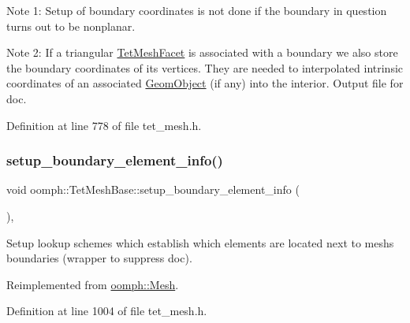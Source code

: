 Note 1\+: Setup of boundary coordinates is not done if the boundary in question turns out to be nonplanar.

Note 2\+: If a triangular \hyperlink{classoomph_1_1TetMeshFacet}{Tet\+Mesh\+Facet} is associated with a boundary we also store the boundary coordinates of its vertices. They are needed to interpolated intrinsic coordinates of an associated \hyperlink{classoomph_1_1GeomObject}{Geom\+Object} (if any) into the interior. Output file for doc. 

Definition at line 778 of file tet\+\_\+mesh.\+h.

\mbox{\label{classoomph_1_1TetMeshBase_ac372c93f2834c864f7376f1aceda718f}} 
\subsubsection{\texorpdfstring{setup\+\_\+boundary\+\_\+element\+\_\+info()}{setup\_boundary\_element\_info()}\hspace{0.1cm}{\footnotesize\ttfamily [1/2]}}
{\footnotesize\ttfamily void oomph\+::\+Tet\+Mesh\+Base\+::setup\+\_\+boundary\+\_\+element\+\_\+info (\begin{DoxyParamCaption}{ }\end{DoxyParamCaption})\hspace{0.3cm}{\ttfamily [inline]}, {\ttfamily [virtual]}}

Setup lookup schemes which establish which elements are located next to mesh\textquotesingle{}s boundaries (wrapper to suppress doc). 

Reimplemented from \hyperlink{classoomph_1_1Mesh_a6cc8bcd6b41209f0e9295cc993d9c6bb}{oomph\+::\+Mesh}.



Definition at line 1004 of file tet\+\_\+mesh.\+h.

\mbox{\label{classoomph_1_1TetMeshBase_a5982b96584e7f60eeb62f51153ef29f4}} 
